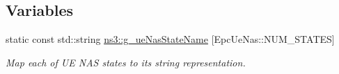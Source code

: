 \subsection*{Variables}
\begin{DoxyCompactItemize}
\item 
static const std\+::string \hyperlink{namespacens3_a11abf10fff4439b8571207ca69cf1cb8}{ns3\+::g\+\_\+ue\+Nas\+State\+Name} \mbox{[}Epc\+Ue\+Nas\+::\+N\+U\+M\+\_\+\+S\+T\+A\+T\+ES\mbox{]}
\begin{DoxyCompactList}\small\item\em Map each of UE N\+AS states to its string representation. \end{DoxyCompactList}\end{DoxyCompactItemize}
